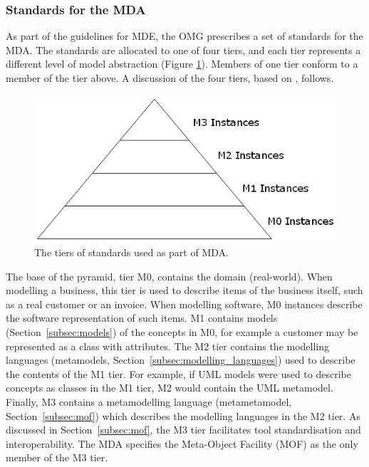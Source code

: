 \subsubsection{Standards for the MDA}
As part of the guidelines for MDE, the OMG prescribes a set of standards for the MDA. The standards are allocated to one of four tiers, and each tier represents a different level of model abstraction (Figure \ref{fig:mda-pyramid}). Members of one tier conform to a member of the tier above. A discussion of the four tiers, based on \cite[Section 8.2]{kleppe03mda}, follows.

\begin{figure}[htbp]
  \begin{center}
    \leavevmode
    \includegraphics[scale=0.5]{2.Background/images/mda-pyramid.png}
  \end{center}
  \caption{The tiers of standards used as part of MDA.}
  \label{fig:mda-pyramid}
\end{figure}

The base of the pyramid, tier M0, contains the domain (real-world). When modelling a business, this tier is used to describe items of the business itself, such as a real customer or an invoice. When modelling software, M0 instances describe the software representation of such items. M1 contains models (Section~\ref{subsec:models}) of the concepts in M0, for example a customer may be represented as a class with attributes. The M2 tier contains the modelling languages (metamodels, Section~\ref{subsec:modelling_languages}) used to describe the contents of the M1 tier. For example, if UML \cite{uml212} models were used to describe concepts as classes in the M1 tier, M2 would contain the UML metamodel. Finally, M3 contains a metamodelling language (metametamodel, Section~\ref{subsec:mof}) which describes the modelling languages in the M2 tier. As discussed in Section~\ref{subsec:mof}, the M3 tier facilitates tool standardisation and interoperability. The MDA specifies the Meta-Object Facility (MOF) \cite{mof} as the only member of the M3 tier.


